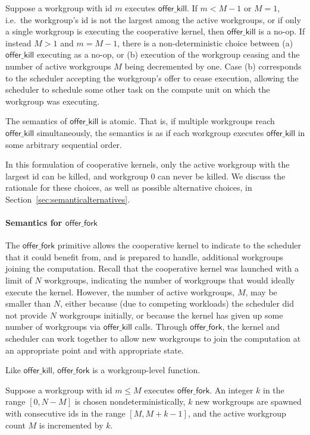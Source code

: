 \documentclass[nocopyrightspace]{sigplanconf-pldi16}
\newcommand{\offerfork}{\mathsf{offer\_fork}}
\newcommand{\offerkill}{\mathsf{offer\_kill}}
\begin{document}
Suppose a workgroup with id $m$ executes $\offerkill$.  If $m < M-1$
or $M=1$, i.e.\ the workgroup's id is not the largest among the active
workgroups, or if only a single workgroup is executing the cooperative
kernel, then $\offerkill$ is a no-op.  If instead $M > 1$ and $m =
M-1$, there is a non-deterministic choice between (a) $\offerkill$
executing as a no-op, or (b) execution of the workgroup ceasing and
the number of active workgroups $M$ being decremented by one.  Case
(b) corresponds to the scheduler accepting the workgroup's offer to
cease execution, allowing the scheduler to schedule some other task on
the compute unit on which the workgroup was executing.

The semantics of $\offerkill$ is atomic.  That is, if multiple
workgroups reach $\offerkill$ simultaneously, the semantics is as if
each workgroup executes $\offerkill$ in some arbitrary sequential
order.

In this formulation of cooperative kernels, only the active workgroup
with the largest id can be killed, and workgroup 0 can never be
killed.  We discuss the rationale for these choices, as well as
possible alternative choices, in
Section~\ref{sec:semanticalternatives}.

\paragraph{Semantics for $\offerfork$}

The $\offerfork$ primitive allows the cooperative kernel to indicate
to the scheduler that it could benefit from, and is prepared to
handle, additional workgroups joining the computation.  Recall that
the cooperative kernel was launched with a limit of $N$ workgroups,
indicating the number of workgroups that would ideally execute the
kernel.  However, the number of active workgroups, $M$, may be smaller
than $N$, either because (due to competing workloads) the scheduler
did not provide $N$ workgroups initially, or because the kernel has
given up some number of workgroups via $\offerkill$ calls.  Through
$\offerfork$, the kernel and scheduler can work together to allow new
workgroups to join the computation at an appropriate point and with
appropriate state.

Like $\offerkill$, $\offerfork$ is a workgroup-level function.

Suppose a workgroup with id $m\leq M$ executes $\offerfork$.  An
integer $k$ in the range $[0, N-M]$ is chosen nondeterministically,
$k$ new workgroups are spawned with consecutive ids in the range $[M,
  M+k-1]$, and the active workgroup count $M$ is incremented by $k$.
\end{document}
